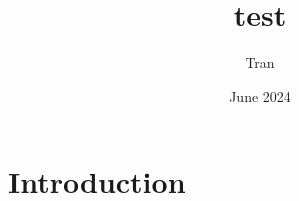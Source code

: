 \documentclass{article}
\title{test}
\author{Tran}
\date{June 2024}
\begin{document}
        
\maketitle
        
\section{Introduction}
        
\end{document}

